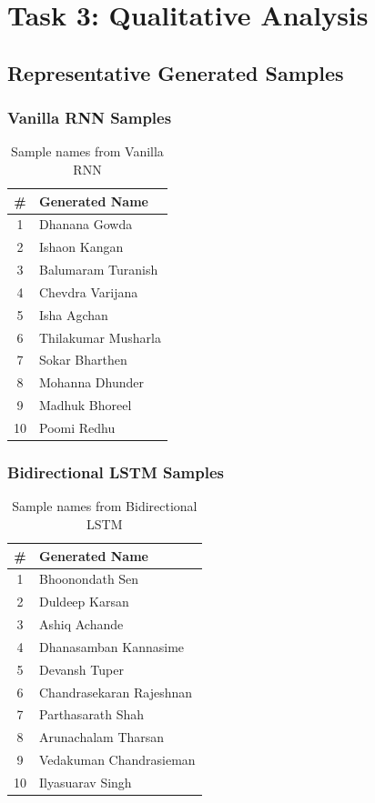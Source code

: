 \documentclass[11pt,a4paper]{article}
\begin{document}
\section{Task 3: Qualitative Analysis}

\subsection{Representative Generated Samples}

\subsubsection{Vanilla RNN Samples}
\begin{table}[H]
\centering
\caption{Sample names from Vanilla RNN}
\renewcommand{\arraystretch}{1.3}
\begin{tabularx}{\textwidth}{cX}
\toprule
\textbf{\#} & \textbf{Generated Name} \\
\midrule
1 & Dhanana Gowda \\
2 & Ishaon Kangan \\
3 & Balumaram Turanish \\
4 & Chevdra Varijana \\
5 & Isha Agchan \\
6 & Thilakumar Musharla \\
7 & Sokar Bharthen \\
8 & Mohanna Dhunder \\
9 & Madhuk Bhoreel \\
10 & Poomi Redhu \\
\bottomrule
\end{tabularx}
\end{table}

\subsubsection{Bidirectional LSTM Samples}
\begin{table}[H]
\centering
\caption{Sample names from Bidirectional LSTM}
\renewcommand{\arraystretch}{1.3}
\begin{tabularx}{\textwidth}{cX}
\toprule
\textbf{\#} & \textbf{Generated Name} \\
\midrule
1 & Bhoonondath Sen \\
2 & Duldeep Karsan \\
3 & Ashiq Achande \\
4 & Dhanasamban Kannasime \\
5 & Devansh Tuper \\
6 & Chandrasekaran Rajeshnan \\
7 & Parthasarath Shah \\
8 & Arunachalam Tharsan \\
9 & Vedakuman Chandrasieman \\
10 & Ilyasuarav Singh \\
\bottomrule
\end{tabularx}
\end{table}
\end{document}
